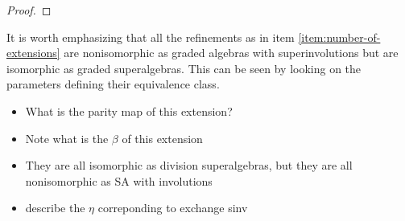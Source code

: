 \begin{proof}
    
    
    
\end{proof}

It is worth emphasizing that all the refinements as in item \eqref{item:number-of-extensions} are nonisomorphic as graded algebras with superinvolutions but are isomorphic as graded superalgebras. 
This can be seen by looking on the parameters defining their equivalence class. 


\begin{itemize}
    \item What is the parity map of this extension?
    \item Note what is the $\beta$ of this extension
    \item They are all isomorphic as division superalgebras, but they are all nonisomorphic as SA with involutions
    \item describe the $\eta$ correponding to exchange sinv
\end{itemize}


